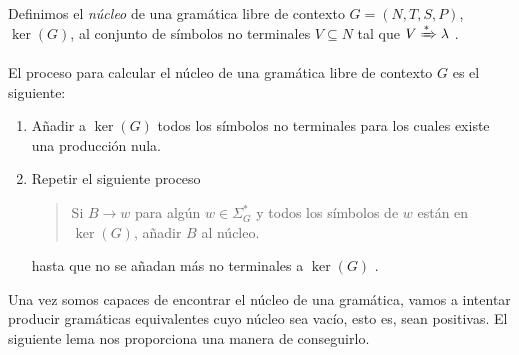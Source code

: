 \begin{definicion}[Núcleo]Definimos el \textit{núcleo} de una gramática libre de contexto $G=(N,T,S,P)$, $\ker(G)$, al 
conjunto de símbolos no terminales $V\subseteq N$ tal que $V\xRightarrow{*}\lambda$ \cite{davis_sigal_weyuker_1994}.
\end{definicion}

El proceso para calcular el núcleo de una gramática libre de contexto $G$ es el siguiente:
\begin{enumerate}
    \item Añadir a $\ker(G)$ todos los símbolos no terminales para los cuales existe una producción nula.
    \item Repetir el siguiente proceso
    \begin{quote}
        Si $B\to w$ para algún $w\in\Sigma_G^*$ y todos los símbolos de $w$ están en $\ker(G)$, añadir $B$ al núcleo.
    \end{quote}
    hasta que no se añadan más no terminales a $\ker(G)$ \cite{kelley_2001}.
\end{enumerate}

Una vez somos capaces de encontrar el núcleo de una gramática, vamos a intentar producir gramáticas equivalentes cuyo
núcleo sea vacío, esto es, sean positivas. El siguiente lema nos proporciona una manera de conseguirlo.

